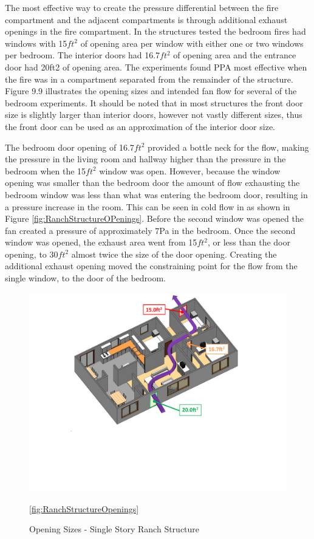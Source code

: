 \documentclass{article}
\begin{document}
The most effective way to create the pressure differential between the fire compartment and the adjacent compartments is through additional exhaust openings in the fire compartment. In the structures tested the bedroom fires had windows with 15$ft^2$ of opening area per window with either one or two windows per bedroom. The interior doors had 16.7$ft^2$ of opening area and the entrance door had 20ft2 of opening area. The experiments found PPA most effective when the fire was in a compartment separated from the remainder of the structure. Figure 9.9 illustrates the opening sizes and intended fan flow for several of the bedroom experiments. It should be noted that in most structures the front door size is slightly larger than interior doors, however not vastly different sizes, thus the front door can be used as an approximation of the interior door size.

The bedroom door opening of 16.7$ft^2$ provided a bottle neck for the flow, making the pressure in the living room and hallway higher than the pressure in the bedroom when the 15$ft^2$ window was open. However, because the window opening was smaller than the bedroom door the amount of flow exhausting the bedroom window was less than what was entering the bedroom door, resulting in a pressure increase in the room. This can be seen in cold flow in as shown in Figure \ref{fig:RanchStructureOPenings}. Before the second window was opened the fan created a pressure of approximately 7Pa in the bedroom. Once the second window was opened, the exhaust area went from 15$ft^2$, or less than the door opening, to 30$ft^2$ almost twice the size of the door opening. Creating the additional exhaust opening moved the constraining point for the flow from the single window,
to the door of the bedroom.

\begin{figure}
	\centering
	\includegraphics[width = 5in]{0_Images/Tactical_Considerations/PPA_Exhaust_Dependant/Opening_Sizes.pdf}
	\caption{Opening Sizes - Single Story Ranch Structure}
	\ref{fig:RanchStructureOpenings}
\end{figure}
\end{document}
